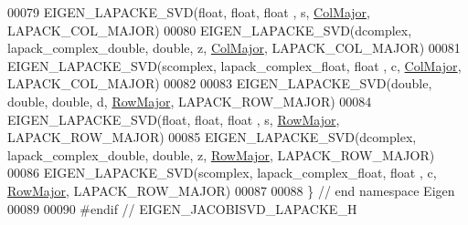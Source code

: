 \begin{DoxyCode}
00079 EIGEN\_LAPACKE\_SVD(\textcolor{keywordtype}{float},    \textcolor{keywordtype}{float},                 \textcolor{keywordtype}{float} , s, \hyperlink{group__enums_ggaacded1a18ae58b0f554751f6cdf9eb13a0cbd4bdd0abcfc0224c5fcb5e4f6669a}{ColMajor}, LAPACK\_COL\_MAJOR)
00080 EIGEN\_LAPACKE\_SVD(dcomplex, lapack\_complex\_double, \textcolor{keywordtype}{double}, z, \hyperlink{group__enums_ggaacded1a18ae58b0f554751f6cdf9eb13a0cbd4bdd0abcfc0224c5fcb5e4f6669a}{ColMajor}, LAPACK\_COL\_MAJOR)
00081 EIGEN\_LAPACKE\_SVD(scomplex, lapack\_complex\_float,  \textcolor{keywordtype}{float} , c, \hyperlink{group__enums_ggaacded1a18ae58b0f554751f6cdf9eb13a0cbd4bdd0abcfc0224c5fcb5e4f6669a}{ColMajor}, LAPACK\_COL\_MAJOR)
00082 
00083 EIGEN\_LAPACKE\_SVD(\textcolor{keywordtype}{double},   \textcolor{keywordtype}{double},                \textcolor{keywordtype}{double}, d, \hyperlink{group__enums_ggaacded1a18ae58b0f554751f6cdf9eb13acfcde9cd8677c5f7caf6bd603666aae3}{RowMajor}, LAPACK\_ROW\_MAJOR)
00084 EIGEN\_LAPACKE\_SVD(\textcolor{keywordtype}{float},    \textcolor{keywordtype}{float},                 \textcolor{keywordtype}{float} , s, \hyperlink{group__enums_ggaacded1a18ae58b0f554751f6cdf9eb13acfcde9cd8677c5f7caf6bd603666aae3}{RowMajor}, LAPACK\_ROW\_MAJOR)
00085 EIGEN\_LAPACKE\_SVD(dcomplex, lapack\_complex\_double, \textcolor{keywordtype}{double}, z, \hyperlink{group__enums_ggaacded1a18ae58b0f554751f6cdf9eb13acfcde9cd8677c5f7caf6bd603666aae3}{RowMajor}, LAPACK\_ROW\_MAJOR)
00086 EIGEN\_LAPACKE\_SVD(scomplex, lapack\_complex\_float,  \textcolor{keywordtype}{float} , c, \hyperlink{group__enums_ggaacded1a18ae58b0f554751f6cdf9eb13acfcde9cd8677c5f7caf6bd603666aae3}{RowMajor}, LAPACK\_ROW\_MAJOR)
00087 
00088 \} \textcolor{comment}{// end namespace Eigen}
00089 
00090 \textcolor{preprocessor}{#endif // EIGEN\_JACOBISVD\_LAPACKE\_H}
\end{DoxyCode}
